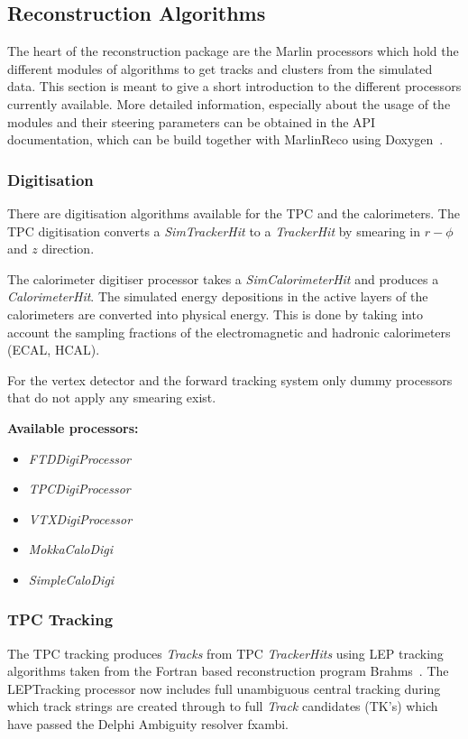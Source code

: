 \subsection{Reconstruction Algorithms}

The heart of the reconstruction package are the Marlin processors
which hold the different modules of algorithms to get tracks and 
clusters from the simulated data. This section is meant to give a short 
introduction to the different processors currently available. More detailed 
information, especially about the usage of the modules and their 
steering parameters can be obtained in the API documentation, which can be
build together with MarlinReco using Doxygen~\cite{ref_doxygen}. 

\subsubsection{Digitisation}

There are digitisation algorithms available for the TPC and the 
calorimeters. 
The TPC digitisation converts a 
{\em SimTrackerHit} to a {\em TrackerHit} by smearing in $r-\phi$ and $z$ 
direction.

The calorimeter digitiser processor 
takes a {\em SimCalorimeterHit} and produces a {\em CalorimeterHit}. 
The simulated energy depositions in the active 
layers of the calorimeters are converted into physical energy. 
This is done by taking into account the sampling fractions of 
the electromagnetic and hadronic calorimeters (ECAL, HCAL). 

For the vertex detector and
the forward tracking system only dummy processors that do not apply any 
smearing exist.

{\bf Available processors:} 
\begin{itemize}
\item {\em FTDDigiProcessor}
\item {\em TPCDigiProcessor}
\item {\em VTXDigiProcessor}
\item {\em MokkaCaloDigi} 
\item {\em SimpleCaloDigi}
\end{itemize}

\subsubsection{TPC Tracking}

The TPC tracking produces {\em Tracks} from TPC {\em TrackerHits} using LEP 
tracking algorithms taken from the Fortran based reconstruction program 
Brahms~\cite{ref_brahms}. 
The LEPTracking processor now includes full unambiguous central tracking during
which track strings are created through to full {\em Track} candidates (TK's) 
which have passed the Delphi Ambiguity resolver fxambi. 

